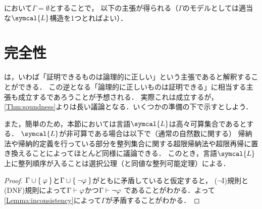 において\(\Gamma = \emptyset\)とすることで，
以下の主張が得られる（\(\Gamma\)のモデルとしては適当な\(\symcal{L}\)構造を1つとればよい）．


\section{完全性} \label{sec:completeness}

は，いわば「証明できるものは論理的に正しい」という主張であると解釈することができる．
この逆となる「論理的に正しいものは証明できる」に相当する主張も成立するであろうことが予想される．
実際これは成立するが，\cref{Thm:soundness}よりは長い議論となる．いくつかの準備の下で示すとしよう．

また，簡単のため，本節においては言語\(\symcal{L}\)は高々可算集合であるとする．
\(\symcal{L}\)が非可算である場合は以下で（通常の自然数に関する）
帰納法や帰納的定義を行っている部分を整列集合に関する超限帰納法や超限再帰に置き換えることによってほとんど同様に議論できる．
このとき，言語\(\symcal{L}\)上に整列順序が入ることは選択公理（と同値な整列可能定理）による．


\begin{proof}
	\(\Gamma \cup \Set{\varphi}\)と\(\Gamma \cup \Set{\lnot \varphi}\)がともに矛盾していると仮定すると，
	(\(\lnot\)I)規則と(DNF)規則によって\(\Gamma \vdash \varphi\)かつ\(\Gamma \vdash \lnot \varphi\)
	であることがわかる．よって\cref{Lemma:inconsistency}によって\(\Gamma\)が矛盾することがわかる．
\end{proof}


